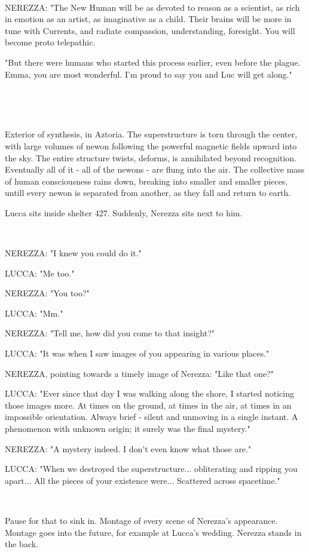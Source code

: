 \documentclass[11pt]{article}
\begin{document}
\ 

NEREZZA: "The New Human will be as devoted to reason as a scientist, as rich in emotion as an artist, as imaginative as a child.
Their brains will be more in tune with Currents, and radiate compassion, understanding, foresight.
You will become proto telepathic.

"But there were humans who started this process earlier, even before the plague.
Emma, you are most wonderful.
I'm proud to say you and Luc will get along."

\ 

\ 

Exterior of synthesis, in Aztoria.
The superstructure is torn through the center, with large volumes of newon following the powerful magnetic fields upward into the sky. 
The entire structure twists, deforms, is annihilated beyond recognition.
Eventually all of it - all of the newons - are flung into the air.
The collective mass of human consciousness rains down, breaking into smaller and smaller pieces, untill every newon is separated from another, as they fall and return to earth. 

Lucca sits inside shelter 427. 
Suddenly, Nerezza sits next to him.

\ 

NEREZZA: "I knew you could do it."

LUCCA: "Me too."

NEREZZA: "You too?"

LUCCA: "Mm."

NEREZZA: "Tell me, how did you come to that insight?"

LUCCA: "It was when I saw images of you appearing in various places."

NEREZZA, pointing towards a timely image of Nerezza: "Like that one?"

LUCCA: "Ever since that day I was walking along the shore, I started noticing those images more.
At times on the ground, at times in the air, at times in an impossible orientation. 
Always brief - silent and unmoving in a single instant.
A phenomenon with unknown origin; it surely was the final mystery."

NEREZZA: "A mystery indeed. 
I don't even know what those are."

LUCCA: "When we destroyed the superstructure... obliterating and ripping you apart...
All the pieces of your existence were... 
Scattered across spacetime."

\ 

Pause for that to sink in.
Montage of every scene of Nerezza's appearance.
Montage goes into the future, for example at Lucca's wedding.
Nerezza stands in the back.
\end{document}
